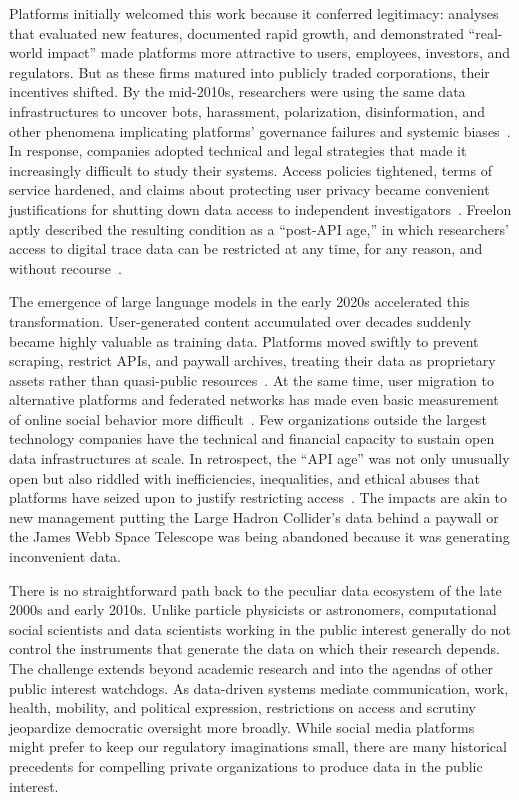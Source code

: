 \documentclass[acmsmall,screen]{acmart}
\begin{document}
Platforms initially welcomed this work because it conferred legitimacy: analyses that evaluated new features, documented rapid growth, and demonstrated ``real-world impact'' made platforms more attractive to users, employees, investors, and regulators. But as these firms matured into publicly traded corporations, their incentives shifted. By the mid-2010s, researchers were using the same data infrastructures to uncover bots, harassment, polarization, disinformation, and other phenomena implicating platforms' governance failures and systemic biases~\cite{marwick_and_lewis,Walker_disinformationlandscapelockdown_2019}. In response, companies adopted technical and legal strategies that made it increasingly difficult to study their systems. Access policies tightened, terms of service hardened, and claims about protecting user privacy became convenient justifications for shutting down data access to independent investigators~\cite{confessore_cambridge_2018,bobrowsky_FacebookDisablesAccess_2021,stokel-walker_under_2024}. Freelon aptly described the resulting condition as a ``post-API age,'' in which researchers' access to digital trace data can be restricted at any time, for any reason, and without recourse~\cite{Freelon_ComputationalResearchPostAPI_2018}.

The emergence of large language models in the early 2020s accelerated this transformation. User-generated content accumulated over decades suddenly became highly valuable as training data. Platforms moved swiftly to prevent scraping, restrict APIs, and paywall archives, treating their data as proprietary assets rather than quasi-public resources~\cite{isaac_RedditWantsGet_2023,roose_data_2024}. At the same time, user migration to alternative platforms and federated networks has made even basic measurement of online social behavior more difficult~\cite{nicholson_truthiness_2024}. Few organizations outside the largest technology companies have the technical and financial capacity to sustain open data infrastructures at scale. In retrospect, the ``API age'' was not only unusually open but also riddled with inefficiencies, inequalities, and ethical abuses that platforms have seized upon to justify restricting access~\cite{boydCriticalQuestionsBig2012,Puschmann_endwildwest_2019}. The impacts are akin to new management putting the Large Hadron Collider's data behind a paywall or the James Webb Space Telescope was being abandoned because it was generating inconvenient data. 

There is no straightforward path back to the peculiar data ecosystem of the late 2000s and early 2010s. Unlike particle physicists or astronomers, computational social scientists and data scientists working in the public interest generally do not control the instruments that generate the data on which their research depends. The challenge extends beyond academic research and into the agendas of other public interest watchdogs. As data-driven systems mediate communication, work, health, mobility, and political expression, restrictions on access and scrutiny jeopardize democratic oversight more broadly. While social media platforms might prefer to keep our regulatory imaginations small, there are many historical precedents for compelling private organizations to produce data in the public interest.
\end{document}
